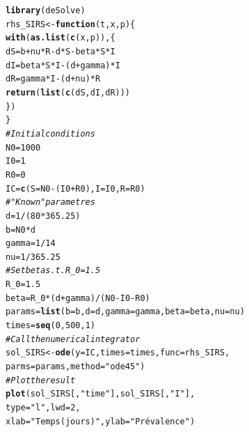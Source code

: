 \documentclass[aspectratio=169]{beamer}\usepackage[]{graphicx}\usepackage[]{xcolor}
\makeatletter
\newcommand{\hlnum}[1]{\textcolor[rgb]{0.686,0.059,0.569}{#1}}%
\newcommand{\hlsng}[1]{\textcolor[rgb]{0.192,0.494,0.8}{#1}}%
\newcommand{\hlcom}[1]{\textcolor[rgb]{0.678,0.584,0.686}{\textit{#1}}}%
\newcommand{\hlopt}[1]{\textcolor[rgb]{0,0,0}{#1}}%
\newcommand{\hldef}[1]{\textcolor[rgb]{0.345,0.345,0.345}{#1}}%
\newcommand{\hlkwa}[1]{\textcolor[rgb]{0.161,0.373,0.58}{\textbf{#1}}}%
\newcommand{\hlkwb}[1]{\textcolor[rgb]{0.69,0.353,0.396}{#1}}%
\newcommand{\hlkwc}[1]{\textcolor[rgb]{0.333,0.667,0.333}{#1}}%
\newcommand{\hlkwd}[1]{\textcolor[rgb]{0.737,0.353,0.396}{\textbf{#1}}}%
\newenvironment{kframe}{%
 \def\at@end@of@kframe{}%
 \ifinner\ifhmode%
  \def\at@end@of@kframe{\end{minipage}}%
  \begin{minipage}{\columnwidth}%
 \fi\fi%
 \def\FrameCommand##1{\hskip\@totalleftmargin \hskip-\fboxsep
 \colorbox{shadecolor}{##1}\hskip-\fboxsep
     \hskip-\linewidth \hskip-\@totalleftmargin \hskip\columnwidth}%
 \MakeFramed {\advance\hsize-\width
   \@totalleftmargin\z@ \linewidth\hsize
   \@setminipage}}%
 {\par\unskip\endMakeFramed%
 \at@end@of@kframe}
\newenvironment{knitrout}{}{} %
\makeatother
\begin{document}
\begin{knitrout}
\color{fgcolor}\begin{kframe}
\begin{alltt}
\hlkwd{library}\hldef{(deSolve)}
\hldef{rhs_SIRS} \hlkwb{<-} \hlkwa{function}\hldef{(}\hlkwc{t}\hldef{,} \hlkwc{x}\hldef{,} \hlkwc{p}\hldef{) \{}
  \hlkwd{with}\hldef{(}\hlkwd{as.list}\hldef{(}\hlkwd{c}\hldef{(x, p)), \{}
    \hldef{dS} \hlkwb{=} \hldef{b} \hlopt{+} \hldef{nu} \hlopt{*} \hldef{R} \hlopt{-} \hldef{d} \hlopt{*} \hldef{S} \hlopt{-} \hldef{beta} \hlopt{*} \hldef{S} \hlopt{*} \hldef{I}
    \hldef{dI} \hlkwb{=} \hldef{beta} \hlopt{*} \hldef{S} \hlopt{*} \hldef{I} \hlopt{-} \hldef{(d} \hlopt{+} \hldef{gamma)} \hlopt{*} \hldef{I}
    \hldef{dR} \hlkwb{=} \hldef{gamma} \hlopt{*} \hldef{I} \hlopt{-} \hldef{(d} \hlopt{+} \hldef{nu)} \hlopt{*} \hldef{R}
    \hlkwd{return}\hldef{(}\hlkwd{list}\hldef{(}\hlkwd{c}\hldef{(dS, dI, dR)))}
  \hldef{\})}
\hldef{\}}
\hlcom{# Initial conditions}
\hldef{N0} \hlkwb{=} \hlnum{1000}
\hldef{I0} \hlkwb{=} \hlnum{1}
\hldef{R0} \hlkwb{=} \hlnum{0}
\hldef{IC} \hlkwb{=} \hlkwd{c}\hldef{(}\hlkwc{S} \hldef{= N0}\hlopt{-}\hldef{(I0}\hlopt{+}\hldef{R0),} \hlkwc{I} \hldef{= I0,} \hlkwc{R} \hldef{= R0)}
\hlcom{# "Known" parametres}
\hldef{d} \hlkwb{=} \hlnum{1}\hlopt{/}\hldef{(}\hlnum{80}\hlopt{*}\hlnum{365.25}\hldef{)}
\hldef{b} \hlkwb{=} \hldef{N0} \hlopt{*} \hldef{d}
\hldef{gamma} \hlkwb{=} \hlnum{1}\hlopt{/}\hlnum{14}
\hldef{nu} \hlkwb{=} \hlnum{1}\hlopt{/}\hlnum{365.25}
\hlcom{# Set beta s.t. R_0 = 1.5}
\hldef{R_0} \hlkwb{=} \hlnum{1.5}
\hldef{beta} \hlkwb{=} \hldef{R_0} \hlopt{*} \hldef{(d} \hlopt{+} \hldef{gamma)} \hlopt{/} \hldef{(N0}\hlopt{-}\hldef{I0}\hlopt{-}\hldef{R0)}
\hldef{params} \hlkwb{=} \hlkwd{list}\hldef{(}\hlkwc{b} \hldef{= b,} \hlkwc{d} \hldef{= d,} \hlkwc{gamma} \hldef{= gamma,} \hlkwc{beta} \hldef{= beta,} \hlkwc{nu} \hldef{= nu)}
\hldef{times} \hlkwb{=} \hlkwd{seq}\hldef{(}\hlnum{0}\hldef{,} \hlnum{500}\hldef{,} \hlnum{1}\hldef{)}
\hlcom{# Call the numerical integrator}
\hldef{sol_SIRS} \hlkwb{<-} \hlkwd{ode}\hldef{(}\hlkwc{y} \hldef{= IC,} \hlkwc{times} \hldef{= times,} \hlkwc{func} \hldef{= rhs_SIRS,}
                \hlkwc{parms} \hldef{= params,} \hlkwc{method} \hldef{=} \hlsng{"ode45"}\hldef{)}
\hlcom{# Plot the result}
\hlkwd{plot}\hldef{(sol_SIRS[,}\hlsng{"time"}\hldef{], sol_SIRS[,}\hlsng{"I"}\hldef{],}
     \hlkwc{type} \hldef{=} \hlsng{"l"}\hldef{,} \hlkwc{lwd} \hldef{=} \hlnum{2}\hldef{,}
     \hlkwc{xlab} \hldef{=} \hlsng{"Temps (jours)"}\hldef{,} \hlkwc{ylab} \hldef{=} \hlsng{"Prévalence"}\hldef{)}
\end{alltt}
\end{kframe}
\end{knitrout}
\end{document}
